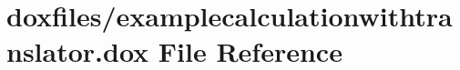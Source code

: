 \hypertarget{examplecalculationwithtranslator_8dox}{}\section{doxfiles/examplecalculationwithtranslator.dox File Reference}
\label{examplecalculationwithtranslator_8dox}
